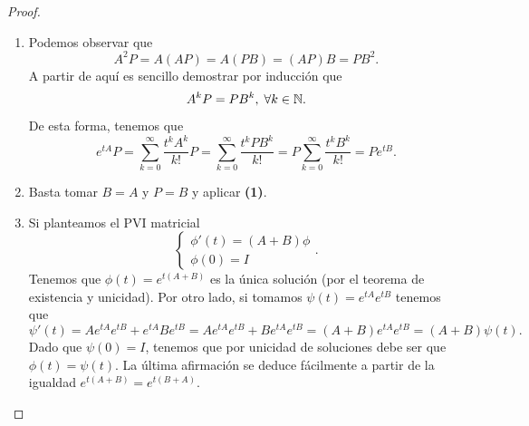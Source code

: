 \begin{proof}
\begin{enumerate}
\item Podemos observar que 
	\[A^{2}P = A\left(AP\right) = A\left(PB\right)=\left(AP\right)B = PB^{2} .\]
A partir de aquí es sencillo demostrar por inducción que 
\[A^{k}P = PB^{k}, \; \forall k \in \mathbb{N} .\]
De esta forma, tenemos que
\[e^{tA}P = \sum^{\infty}_{k = 0}\frac{t ^{k}A^{k}}{k!}P = \sum^{\infty}_{k = 0}\frac{t ^{k}PB^{k}}{k!}=P\sum^{\infty}_{k = 0}\frac{t ^{k}B^{k}}{k!} = Pe^{tB} .\]
\item Basta tomar $\displaystyle B = A $ y $\displaystyle P = B $ y aplicar \textbf{(1)}. 
\item Si planteamos el PVI matricial
	\[
	\begin{cases}
	\phi'\left(t\right)=\left(A + B\right)\phi \\
	\phi\left(0\right)=I
	\end{cases}
	.\]
Tenemos que $\displaystyle \phi\left(t\right)=e^{t\left(A + B\right)} $ es la única solución (por el teorema de existencia y unicidad). Por otro lado, si tomamos $\displaystyle \psi\left(t\right)=e^{tA}e^{tB} $ tenemos que 
\[\psi'\left(t\right) = Ae^{tA}e^{tB}+e^{tA}Be^{tB} = Ae^{tA}e^{tB} + Be^{tA}e^{tB}=\left(A + B\right)e^{tA}e^{tB} = \left(A + B\right)\psi\left(t\right) .\]
Dado que $\displaystyle \psi\left(0\right)=I $, tenemos que por unicidad de soluciones debe ser que $\displaystyle \phi\left(t\right)=\psi\left(t\right) $. La última afirmación se deduce fácilmente a partir de la igualdad $\displaystyle e^{t\left(A + B\right)}=e^{t\left(B + A\right)} $. 
\end{enumerate}
\end{proof}
